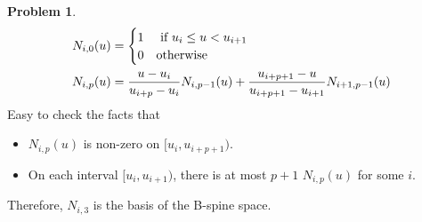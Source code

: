 \documentclass[a4paper]{article}
\theoremstyle{definition}
\newtheorem{problem}{Problem}
\theoremstyle{plain}
\newcommand{\<}{\left<}
\renewcommand{\>}{\right>}
\numberwithin{equation}{problem}
\begin{document}
\begin{problem}
    \begin{align*}
        N_{i,0}(u)&=\begin{cases}
            1&\text{ if  $ u_i \leq u<u_{i+1} $}\\
            0&\text{otherwise}
       \end{cases}\\
       N_{i,p}(u)&=\frac{u-u_i}{u_{i+p}-u_i}N_{i,p-1}(u)+\frac{u_{i+p+1}-u}{u_{i+p+1}-u_{i+1}}N_{i+1,p-1}(u)
    \end{align*}
    Easy to check the facts that 
    \begin{itemize}
        \item  $ N_{i,p}(u) $ is non-zero on  $ [u_i,u_{i+p+1}) $.
        \item On each interval  $ [u_i,u_{i+1}) $, there is at most  $ p+1 $  $ N_{i,p}(u) $ for some  $ i $.    
    \end{itemize}
    Therefore,  $ N_{i,3} $ is the basis of the B-spine space. 
\end{problem}
\end{document}

